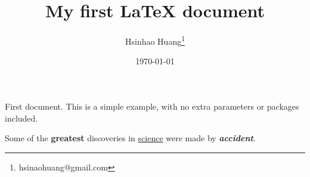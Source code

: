 \documentclass[12pt, a4paper]{article} %
\title{My first LaTeX document}                            %
\author{Hsinhao Huang\thanks{hsinaohuang@gmail.com}}       %
\date{\today}                                              %
\begin{document}

    \maketitle

    First document. This is a simple example, with no
    extra parameters or packages included.

    Some of the \textbf{greatest}                          %
    discoveries in \underline{science}                     %
    were made by \textbf{\textit{accident}}.               %
\end{document}
